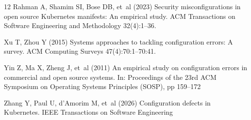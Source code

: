 \documentclass[pdflatex,sn-basic]{sn-jnl}
\begin{document}
\begin{thebibliography}{12}
Rahman A, Shamim SI, Bose DB, et~al (2023) Security misconfigurations in open
  source {Kubernetes} manifests: An empirical study. ACM Transactions on
  Software Engineering and Methodology 32(4):1--36. 

Xu T, Zhou Y (2015) Systems approaches to tackling configuration errors: A
  survey. ACM Computing Surveys 47(4):70:1--70:41. 

Yin Z, Ma X, Zheng J, et~al (2011) An empirical study on configuration errors
  in commercial and open source systems. In: Proceedings of the 23rd ACM
  Symposium on Operating Systems Principles (SOSP), pp 159--172

Zhang Y, Paul U, d'Amorim M, et~al (2026) Configuration defects in
  {Kubernetes}. IEEE Transactions on Software Engineering

\end{thebibliography}
\end{document}
